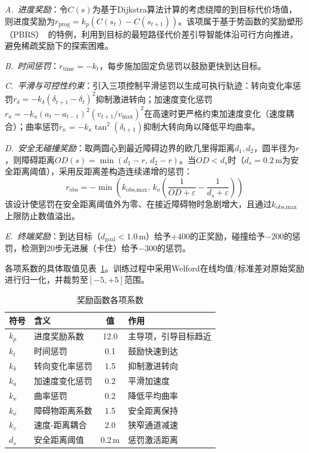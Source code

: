 \documentclass[twocolumn]{elsarticle}
\begin{document}
\textit{A.~进度奖励}：令$C(s)$为基于Dijkstra算法计算的考虑绕障的到目标代价场值，则进度奖励为$r_{\text{prog}} = k_p(C(s_t) - C(s_{t+1}))$。该项属于基于势函数的奖励塑形（PBRS）~\cite{mueller2025pbrs}的特例，利用到目标的最短路径代价差引导智能体沿可行方向推进，避免稀疏奖励下的探索困难。

\textit{B.~时间惩罚}：$r_{\text{time}} = -k_t$，每步施加固定负惩罚以鼓励更快到达目标。

\textit{C.~平滑与可控性约束}：引入三项控制平滑惩罚以生成可执行轨迹：转向变化率惩罚$r_{\delta} = -k_{\delta}(\delta_{t+1}-\delta_t)^2$抑制激进转向；加速度变化惩罚$r_a = -k_a(a_t-a_{t-1})^2(v_{t+1}/v_{\max})^2$在高速时更严格约束加速度变化（速度耦合）；曲率惩罚$r_{\kappa} = -k_{\kappa}\tan^2(\delta_{t+1})$抑制大转向角以降低平均曲率。

\textit{D.~安全无碰撞奖励}：取两圆心到最近障碍边界的欧几里得距离$d_1,d_2$，圆半径为$r$，则障碍距离$OD(s)=\min(d_1-r,\,d_2-r)$。当$OD<d_s$时（$d_s=0.2$\,m为安全距离阈值），采用反距离差构造连续递增的惩罚：
\begin{equation}
  r_{\text{obs}} = -\min\!\left(k_{\text{obs,max}},\, k_o\!\left(\frac{1}{OD+\varepsilon}-\frac{1}{d_s+\varepsilon}\right)\right)
\end{equation}
该设计使惩罚在安全距离阈值外为零、在接近障碍物时急剧增大，且通过$k_{\text{obs,max}}$上限防止数值溢出。

\textit{E.~终端奖励}：到达目标（$d_{\text{goal}}<1.0$\,m）给予$+400$的正奖励，碰撞给予$-200$的惩罚，检测到20步无进展（卡住）给予$-300$的惩罚。

各项系数的具体取值见表~\ref{tab:reward_coefficients}。训练过程中采用Welford在线均值/标准差对原始奖励进行归一化，并裁剪至$[-5, +5]$范围。

\begin{table}[t]
\centering
\caption{奖励函数各项系数}
\label{tab:reward_coefficients}
\footnotesize
\begin{tabular}{@{}llcl@{}}
\toprule
\textbf{符号} & \textbf{含义} & \textbf{值} & \textbf{作用} \\
\midrule
$k_p$ & 进度奖励系数 & 12.0 & 主导项，引导目标趋近 \\
$k_t$ & 时间惩罚 & 0.1 & 鼓励快速到达 \\
$k_\delta$ & 转向变化率惩罚 & 1.5 & 抑制激进转向 \\
$k_a$ & 加速度变化惩罚 & 0.2 & 平滑加速度 \\
$k_\kappa$ & 曲率惩罚 & 0.2 & 降低平均曲率 \\
$k_o$ & 障碍物距离系数 & 1.5 & 安全距离保持 \\
$k_v$ & 速度-距离耦合 & 2.0 & 狭窄通道减速 \\
$d_s$ & 安全距离阈值 & 0.2\,m & 惩罚激活距离 \\
\bottomrule
\end{tabular}
\end{table}
\end{document}
